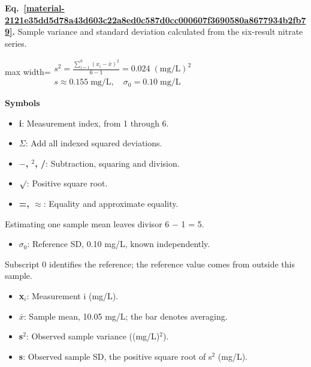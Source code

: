 \documentclass[11pt,a4paper]{article}
\begin{document}
\par\medskip
\noindent\begin{minipage}{\linewidth}
\label{material-2121e35dd5d78a43d603c22a8ed0c587d0cc000607f3690580a8677934b2fb79}
\noindent\textbf{Eq.~\ref*{material-2121e35dd5d78a43d603c22a8ed0c587d0cc000607f3690580a8677934b2fb79}.} Sample variance and standard deviation calculated from the six-result nitrate series.\par\nopagebreak
\begin{center}\begin{adjustbox}{max width=\linewidth}$\displaystyle \begin{gathered}s^2=\frac{\sum_{i=1}^{6}(x_i-\bar x)^2}{6-1}=0.024\;(\mathrm{mg/L})^2\\s\approx0.155\;\mathrm{mg/L},\quad\sigma_0=0.10\;\mathrm{mg/L}\end{gathered}$\end{adjustbox}\end{center}

\par\noindent\textbf{Symbols}

\begin{itemize}\setlength{\itemsep}{1pt}\setlength{\parsep}{0pt}
\item \textbf{i}: Measurement index, from 1 through 6.
\item \textbf{\ensuremath{\Sigma}}: Add all indexed squared deviations.
\item \textbf{\ensuremath{-}, \ensuremath{{}^2}, /}: Subtraction, squaring and division.
\item \textbf{\ensuremath{\sqrt{\vphantom{x}}}}: Positive square root.
\item \textbf{=, \ensuremath{\approx}}: Equality and approximate equality.
\end{itemize}

Estimating one sample mean leaves divisor 6 \ensuremath{-} 1 = 5.

\begin{itemize}\setlength{\itemsep}{1pt}\setlength{\parsep}{0pt}
\item \textbf{\ensuremath{\sigma}\ensuremath{{}_0}}: Reference SD, 0.10 mg/L, known independently.
\end{itemize}

Subscript 0 identifies the reference; the reference value comes from outside this sample.

\begin{itemize}\setlength{\itemsep}{1pt}\setlength{\parsep}{0pt}
\item \textbf{x\ensuremath{{}_i}}: Measurement i (mg/L).
\item \textbf{\ensuremath{\bar{x}}}: Sample mean, 10.05 mg/L; the bar denotes averaging.
\item \textbf{s\ensuremath{{}^2}}: Observed sample variance ((mg/L)\ensuremath{{}^2}).
\item \textbf{s}: Observed sample SD, the positive square root of s\ensuremath{{}^2} (mg/L).
\end{itemize}

\end{minipage}\par
\medskip
\end{document}
